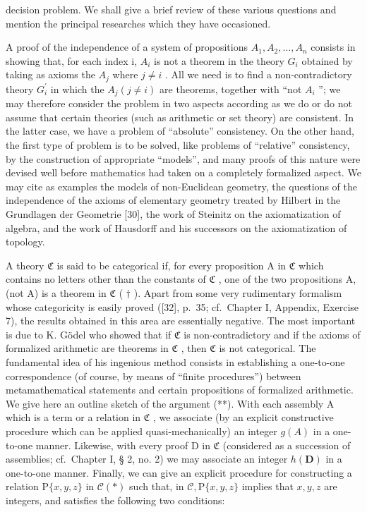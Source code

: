 decision problem. We shall give a brief review of these various questions and mention the principal researches which they have occasioned.

A proof of the independence of a system of propositions \(A_{1}, A_{2}, \ldots, A_{n}\) consists in showing that, for each index i, \(A_{i}\) is not a theorem in the theory \(G_{i}\) obtained by taking as axioms the \(A_{j}\) where \(j \neq i\) . All we need is to find a non-contradictory theory \(G_{i}^{\prime}\) in which the \(A_{j} (j \neq i)\) are theorems, together with ``not \(A_{i}\) ''; we may therefore consider the problem in two aspects according as we do or do not assume that certain theories (such as arithmetic or set theory) are consistent. In the latter case, we have a problem of ``absolute'' consistency. On the other hand, the first type of problem is to be solved, like problems of ``relative'' consistency, by the construction of appropriate ``models'', and many proofs of this nature were devised well before mathematics had taken on a completely formalized aspect. We may cite as examples the models of non-Euclidean geometry, the questions of the independence of the axioms of elementary geometry treated by Hilbert in the Grundlagen der Geometrie {[}30{]}, the work of Steinitz on the axiomatization of algebra, and the work of Hausdorff and his successors on the axiomatization of topology.

A theory \(\mathfrak{C}\) is said to be categorical if, for every proposition A in \(\mathfrak{C}\) which contains no letters other than the constants of \(\mathfrak{C}\) , one of the two propositions A, (not A) is a theorem in \(\mathfrak{C}\) ( \(\dagger\) ). Apart from some very rudimentary formalism whose categoricity is easily proved ({[}32{]}, p.~35; cf.~Chapter I, Appendix, Exercise 7), the results obtained in this area are essentially negative. The most important is due to K. Gödel who showed that if \(\mathfrak{C}\) is non-contradictory and if the axioms of formalized arithmetic are theorems in \(\mathfrak{C}\) , then \(\mathfrak{C}\) is not categorical. The fundamental idea of his ingenious method consists in establishing a one-to-one correspondence (of course, by means of ``finite procedures'') between metamathematical statements and certain propositions of formalized arithmetic. We give here an outline sketch of the argument (**). With each assembly A which is a term or a relation in \(\mathfrak{C}\) , we associate (by an explicit constructive procedure which can be applied quasi-mechanically) an integer \(g(A)\) in a one-to-one manner. Likewise, with every proof D in \(\mathfrak{C}\) (considered as a succession of assemblies; cf.~Chapter I, § 2, no. 2) we may associate an integer \(h(\mathbf{D})\) in a one-to-one manner. Finally, we can give an explicit procedure for constructing a relation \(\mathrm{P}\{x, y, z\}\) in \(\mathcal{C} (*)\) such that, in \(\mathcal{C}, \mathrm{P}\{x, y, z\}\) implies that \(x, y, z\) are integers, and satisfies the following two conditions:

